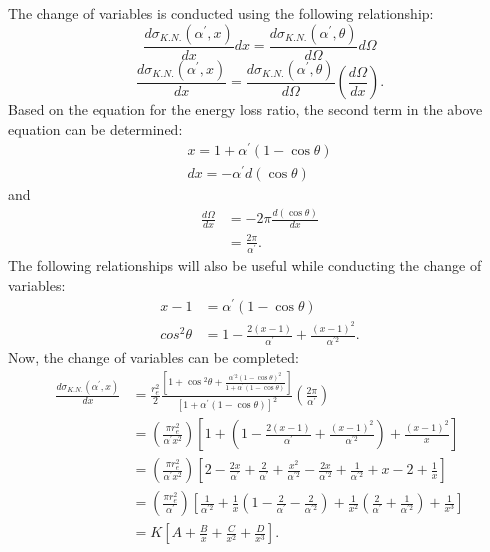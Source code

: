 The change of variables is conducted using the following relationship:
\begin{equation*}
  \frac{d\sigma_{K.N.}(\alpha^{'},x)}{dx} dx = 
  \frac{d\sigma_{K.N.}(\alpha^{'},\theta)}{d\Omega} d\Omega
\end{equation*}
\begin{equation*}
  \frac{d\sigma_{K.N.}(\alpha^{'},x)}{dx} = 
  \frac{d\sigma_{K.N.}(\alpha^{'},\theta)}{d\Omega}
  \left(\frac{d\Omega}{dx}\right).
\end{equation*}
Based on the equation for the energy loss ratio, the second term in the above
equation can be determined:
\begin{align}
  x = 1 + \alpha^{'}(1-\cos{\theta}) \nonumber \\
  dx = -\alpha^{'} d(\cos{\theta}) \nonumber
\end{align}
and
\begin{align}
  \frac{d\Omega}{dx} & = -2\pi\frac{d(\cos{\theta})}{dx} \nonumber \\
  & = \frac{2\pi}{\alpha^{'}}.
\end{align}
The following relationships will also be useful while conducting the change
of variables:
\begin{align}
  x - 1 & = \alpha^{'}(1-\cos{\theta}) \\
  cos^2\theta & = 1 - \frac{2(x-1)}{\alpha^{'}} + \frac{(x-1)^2}{\alpha^{'2}}.
\end{align}
Now, the change of variables can be completed:
\begin{align}
  \frac{d\sigma_{K.N.}(\alpha^{'},x)}{dx} & = \frac{r_e^2}{2}
  \frac{\left[1 + \cos{^{2}\theta} + \frac{\alpha^{'2}(1-\cos{\theta})^2}
                                  {1 + \alpha^{'}(1-\cos{\theta})}\right] }
  {\left[1 + \alpha^{'}(1-\cos{\theta}) \right]^2} 
  \left(\frac{2\pi}{\alpha^{'}}\right) \nonumber \\
  & = \left(\frac{\pi r_e^2}{\alpha^{'}x^2}\right)
  \left[1 + 
    \left(1 - \frac{2(x-1)}{\alpha^{'}} + \frac{(x-1)^2}{\alpha^{'2}}\right) +
    \frac{(x-1)^2}{x} \right] \nonumber \\
  & = \left(\frac{\pi r_e^2}{\alpha^{'}x^2}\right) \left[2 - 
    \frac{2x}{\alpha^{'}} + \frac{2}{\alpha^{'}} +\frac{x^2}{\alpha^{'2}} -
    \frac{2x}{\alpha^{'2}} + \frac{1}{\alpha^{'2}} + x - 2 + \frac{1}{x} \right]
  \nonumber \\
  & = \left(\frac{\pi r_e^2}{\alpha^{'}}\right) \left[ \frac{1}{\alpha^{'2}} +
    \frac{1}{x}\left(1 - \frac{2}{\alpha^{'}}-\frac{2}{\alpha^{'2}}\right) +
    \frac{1}{x^2}\left(\frac{2}{\alpha^{'}} + \frac{1}{\alpha^{'2}}\right) +
    \frac{1}{x^3} \right] \nonumber \\
  & = K \left[A + \frac{B}{x} + \frac{C}{x^2} + \frac{D}{x^3}\right].
\end{align}
